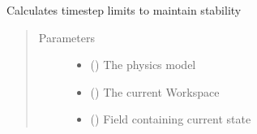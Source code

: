 \documentclass[letterpaper,10pt,english]{sphinxmanual}
\begin{document}
\begin{fulllineitems}
\label{\detokenize{autoapi/stability/index:stability.stability}}
\sphinxAtStartPar
Calculates timestep limits to maintain stability
\begin{quote}\begin{description}
\item[{Parameters}] \leavevmode\begin{itemize}
\item {} 
\sphinxAtStartPar
{} ({\hyperref[\detokenize{autoapi/Model/index:Model.Model}]{}}) \textendash{} The physics model

\item {} 
\sphinxAtStartPar
{} ({\hyperref[\detokenize{autoapi/Workspace/index:Workspace.Workspace}]{}}) \textendash{} The current Workspace

\item {} 
\sphinxAtStartPar
{} ({\hyperref[\detokenize{autoapi/Field/index:Field.Field}]{}}) \textendash{} Field containing current state

\end{itemize}

\end{description}\end{quote}

\end{fulllineitems}


\begin{fulllineitems}
\label{\detokenize{autoapi/stability/index:stability.edge}}
\end{fulllineitems}
\end{document}
